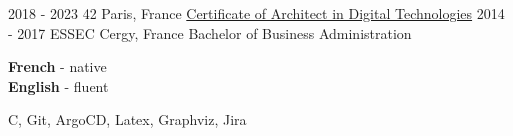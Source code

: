 \documentclass[10pt]{developercv} %
\begin{document}

%



\begin{entrylist}
	\entry
		{2018 - 2023}
		{42}
		{Paris, France}
		{\href{https://cv.42.fr/abarthel}{Certificate of Architect in Digital Technologies}}
	\entry
		{2014 - 2017}
		{ESSEC}
		{Cergy, France}
		{Bachelor of Business Administration}
\end{entrylist}


\begin{minipage}[t]{0.5\textwidth}
	\vspace{-\baselineskip} %


	\textbf{French} - native\\
	\textbf{English} - fluent
\end{minipage}
\hfill
\begin{minipage}[t]{0.5\textwidth}
	\vspace{-\baselineskip} %


	{C, Git, ArgoCD, Latex, Graphviz, Jira}

\end{minipage}

\end{document}
